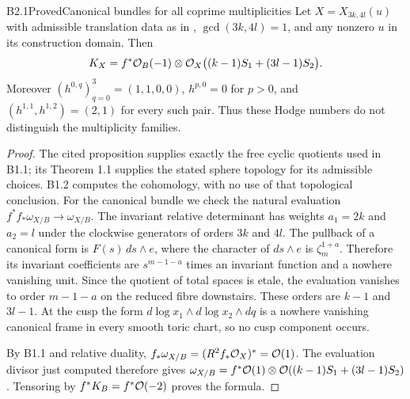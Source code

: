 \begin{claim}{B2.1}{Proved}{Canonical bundles for all coprime multiplicities}
Let $X=X_{3k,4l}(u)$ with admissible translation data as in
\citet[Theorem 1.1 and Proposition 2.3]{ViaclovskyLog2026},
$\gcd(3k,4l)=1$, and any nonzero $u$ in its construction domain.
Then
\[
K_X=f^*\mathcal O_B(-1)\otimes
\mathcal O_X\bigl((k-1)S_1+(3l-1)S_2\bigr).
\]
Moreover $(h^{0,q})_{q=0}^3=(1,1,0,0)$, $h^{p,0}=0$ for $p>0$,
and $(h^{1,1},h^{1,2})=(2,1)$ for every such pair.
Thus these Hodge numbers do not distinguish the multiplicity families.
\end{claim}
\begin{proof}
The cited proposition supplies exactly the free cyclic quotients used
in B1.1; its Theorem 1.1 supplies the stated sphere topology for its
admissible choices. B1.2 computes the cohomology, with no use of that
topological conclusion.
For the canonical bundle we check the natural evaluation
$f^*f_*\omega_{X/B}\to\omega_{X/B}$.
The invariant relative determinant has weights $a_1=2k$ and $a_2=l$
under the clockwise generators of orders $3k$ and $4l$. The pullback
of a canonical form is $F(s)\,ds\wedge e$, where the character of
$ds\wedge e$ is $\zeta_m^{1+a}$. Therefore its invariant coefficients
are $s^{m-1-a}$ times an invariant function and a nowhere vanishing
unit. Since the quotient of total spaces is etale, the evaluation
vanishes to order $m-1-a$ on the reduced fibre downstairs. These orders
are $k-1$ and $3l-1$. At the cusp the form
$d\log x_1\wedge d\log x_2\wedge dq$ is a nowhere vanishing canonical
frame in every smooth toric chart, so no cusp component occurs.

By B1.1 and relative duality,
$f_*\omega_{X/B}=(R^2f_*\mathcal O_X)^*=\mathcal O(1)$.
The evaluation divisor just computed therefore gives
$\omega_{X/B}=f^*\mathcal O(1)\otimes
\mathcal O((k-1)S_1+(3l-1)S_2)$. Tensoring by $f^*K_B=f^*\mathcal O(-2)$
proves the formula.
\end{proof}

